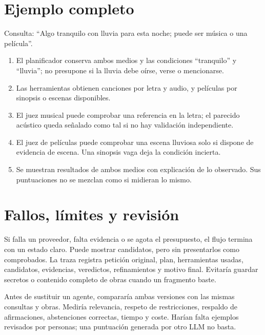 \documentclass[11pt,a4paper]{article}
\begin{document}
\section{Ejemplo completo}
Consulta: ``Algo tranquilo con lluvia para esta noche; puede ser música o una película''.
\begin{enumerate}
\item El planificador conserva ambos medios y las condiciones ``tranquilo'' y ``lluvia''; no presupone si la lluvia debe oírse, verse o mencionarse.
\item Las herramientas obtienen canciones por letra y audio, y películas por sinopsis o escenas disponibles.
\item El juez musical puede comprobar una referencia en la letra; el parecido acústico queda señalado como tal si no hay validación independiente.
\item El juez de películas puede comprobar una escena lluviosa solo si dispone de evidencia de escena. Una sinopsis vaga deja la condición incierta.
\item Se muestran resultados de ambos medios con explicación de lo observado. Sus puntuaciones no se mezclan como si midieran lo mismo.
\end{enumerate}

\section{Fallos, límites y revisión}
Si falla un proveedor, falta evidencia o se agota el presupuesto, el flujo termina con un estado claro. Puede mostrar candidatos, pero sin presentarlos como comprobados. La traza registra petición original, plan, herramientas usadas, candidatos, evidencias, veredictos, refinamientos y motivo final. Evitaría guardar secretos o contenido completo de obras cuando un fragmento baste.

Antes de sustituir un agente, compararía ambas versiones con las mismas consultas y obras. Mediría relevancia, respeto de restricciones, respaldo de afirmaciones, abstenciones correctas, tiempo y coste. Harían falta ejemplos revisados por personas; una puntuación generada por otro LLM no basta.
\end{document}
